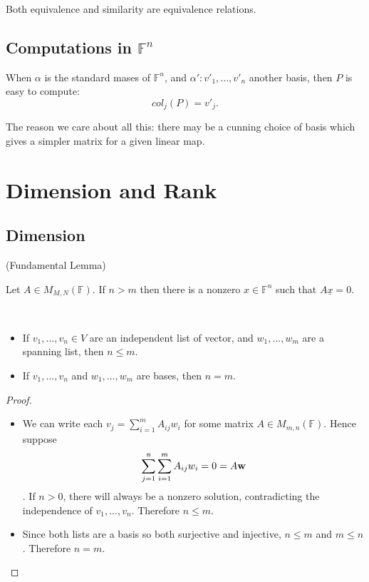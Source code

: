 Both equivalence and similarity are equivalence relations.

\subsection{Computations in $\mathbb{F}^n$}

\begin{example}
  When $\alpha$ is the standard mases of $\mathbb{F}^n$, and $\alpha': v'_1,...,v'_n$ another basis, then $P$ is easy to compute:
  \[col_j(P) = v'_j.\]

\end{example}
The reason we care about all this: there may be a cunning choice of basis which gives a simpler matrix for a given linear map.

\section{Dimension and Rank}
\subsection{Dimension}

\begin{lemma} (Fundamental Lemma)

  Let $A \in M_{M,N}(\mathbb{F})$. If $n > m$ then there is a nonzero $x \in \mathbb{F}^n$ such that $A \underline{x} = 0$.
    
\end{lemma}

\begin{theorem} $ $

  \begin{itemize}
    \item If $v_1,...,v_n \in V$ are an independent list of vector, and $w_1,...,w_m$ are a spanning list, then $n \leq m$.
    \item If $v_1,...,v_n$ and $w_1,...,w_m$ are bases, then $n = m$.
  \end{itemize}
\end{theorem}
\begin{proof} $ $
  \begin{itemize}
    \item We can write each $v_j = \sum_{ i = 1}^{m} A_{ij} w_i$ for some matrix $A \in M_{m, n}(\mathbb{F})$. Hence suppose
      \[\sum_{ j = 1}^{n} \sum_{ i = 1}^{m} A_{ij} w_i = 0 = A \bf{w}\].
      If $n > 0$, there will always be a nonzero solution, contradicting the independence of $v_1,...,v_n$. Therefore $n \leq m$.
    \item Since both lists are a basis so both surjective and injective, $n \leq m$ and $m \leq n$. Therefore $n = m$.
  \end{itemize}
\end{proof}

